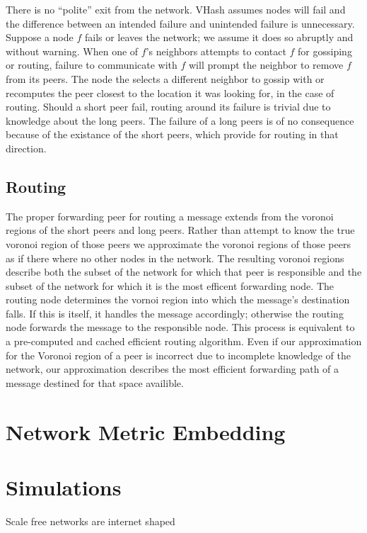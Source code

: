 \documentclass{IEEEtran}
\begin{document}
There is no ``polite'' exit from the network. VHash assumes nodes will fail and the difference between an intended failure and unintended failure is unnecessary. 
Suppose a node $f$ fails or leaves the network; we assume it does so abruptly and without warning.
When one of $f$'s neighbors attempts to contact $f$ for gossiping or routing, failure to communicate with $f$ will prompt the neighbor to remove $f$ from its peers.  
The node the selects a different neighbor to gossip with or recomputes the peer closest to the location it was looking for, in the case of routing. 
Should a short peer fail, routing around its failure is trivial due to knowledge about the long peers.  The failure of a long peers is of no consequence because of the existance of the short peers, which provide for routing in that direction.

\subsection{Routing}
The proper forwarding peer for routing a message extends from the voronoi regions of the short peers and long peers.
Rather than attempt to know the true voronoi region of those peers we approximate the voronoi regions of those peers as if there where no other nodes in the network.
The resulting voronoi regions describe both the subset of the network for which that peer is responsible and the subset of the network for which it is the most efficent forwarding node.
The routing node determines the vornoi region into which the message's destination falls.
If this is itself, it handles the message accordingly; otherwise the routing node forwards the message to the responsible node.
This process is equivalent to a pre-computed and cached efficient routing algorithm.
Even if our approximation for the Voronoi region of a peer is incorrect due to incomplete knowledge of the network, our approximation describes the most efficient forwarding path of a message  destined for that space availible.


\section{Network Metric Embedding}

\section{Simulations}
Scale free networks are internet shaped\cite{cohen2000resilience}
\end{document}
